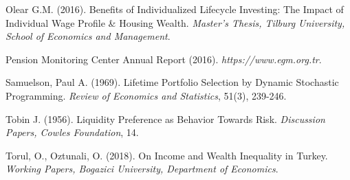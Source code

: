 \begin{description}
\item Olear G.M. (2016). Benefits of Individualized Lifecycle Investing: The Impact of Individual Wage Profile \& Housing Wealth. \textit{Master's Thesis, Tilburg University, School of Economics and Management}.
\item Pension Monitoring Center Annual Report (2016). \textit{https://www.egm.org.tr}.
\item Samuelson, Paul A. (1969). Lifetime Portfolio Selection by Dynamic Stochastic Programming. \textit{Review of Economics and Statistics}, 51(3), 239-246.
\item Tobin J. (1956). Liquidity Preference as Behavior Towards Risk. \textit{Discussion Papers, Cowles Foundation}, 14.
\item Torul, O., Oztunali, O. (2018). On Income and Wealth Inequality in Turkey. \textit{Working Papers, Bogazici University, Department of Economics}.
\end{description}
\endgroup
